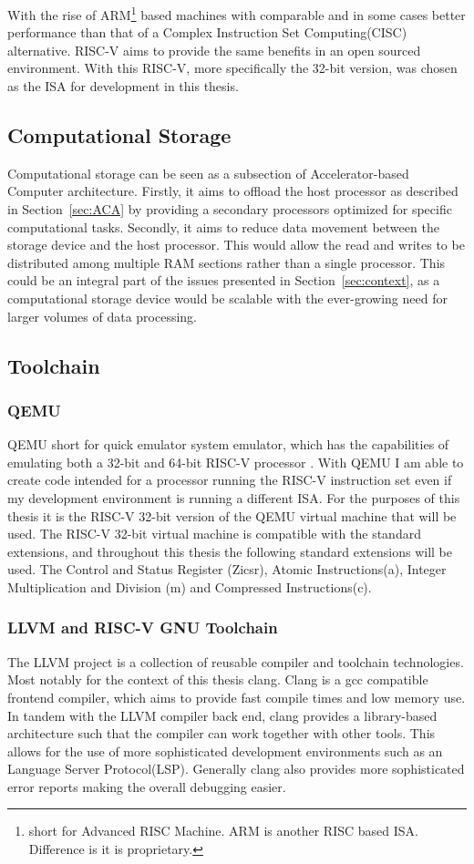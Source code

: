 With the rise of ARM\footnote{short for Advanced RISC Machine. ARM is another
RISC based ISA. Difference is it is proprietary.} based machines with comparable
and in some cases better performance than that of a Complex Instruction Set
Computing(CISC) alternative.\cite{Power_Struggle} RISC-V aims to provide the
same benefits in an open sourced environment. With this RISC-V, more
specifically the 32-bit version, was chosen as the ISA for development in this
thesis.

\subsection{Computational Storage}
Computational storage can be seen as a subsection of Accelerator-based Computer
architecture. Firstly, it aims to offload the host processor as described in
Section~\ref{sec:ACA} by providing a secondary processors optimized for specific
computational tasks. Secondly, it aims to reduce data movement between the
storage device and the host processor. This would allow the read and writes to
be distributed among multiple RAM sections rather than a single processor. This
could be an integral part of the issues presented in Section~\ref{sec:context},
as a computational storage device would be scalable with the ever-growing need
for larger volumes of data processing.


\subsection{Toolchain}
\subsubsection*{QEMU}
QEMU short for quick emulator system emulator, which has the capabilities of
emulating both a 32-bit and 64-bit RISC-V processor \cite{QEMU}. With QEMU I am
able to create code intended for a processor running the RISC-V instruction set
even if my development environment is running a different ISA. For the purposes
of this thesis it is the RISC-V 32-bit version of the QEMU virtual machine that
will be used. The RISC-V 32-bit virtual machine is compatible with the standard
extensions, and throughout this thesis the following standard extensions will be
used. The Control and Status Register (Zicsr), Atomic Instructions(a), Integer
Multiplication and Division (m) and Compressed Instructions(c).

\subsubsection*{LLVM and RISC-V GNU Toolchain}
The LLVM project is a collection of reusable compiler and toolchain
technologies. Most notably for the context of this thesis clang. Clang is a gcc
compatible frontend compiler, which aims to provide fast compile times and low
memory use. In tandem with the LLVM compiler back end, clang provides a
library-based architecture such that the compiler can work together with other
tools. This allows for the use of more sophisticated development environments
such as an Language Server Protocol(LSP). Generally clang also provides more
sophisticated error reports making the overall debugging easier.

